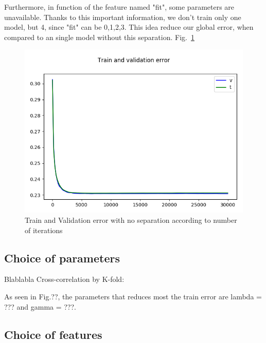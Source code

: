 \documentclass[10pt,conference,compsocconf]{IEEEtran}
\begin{document}
	Furthermore, in function of the feature named "fit", some parameters are unavailable. Thanks to this important information, we don't train only one model, but 4, since "fit" can be {0,1,2,3}.
	This idea reduce our global error, when compared to an single model without this separation. Fig.~\ref{fig:noSepFunction}
	
	\begin{figure}[tbp]
		\centering
		\includegraphics[width=\columnwidth]{valid_train_error_with_thresh_no_jet.png}
		\caption{Train and Validation error with no separation according to number of iterations}
		\vspace{-3mm}
		\label{fig:noSepFunction}
	\end{figure}
	
	\subsection{Choice of parameters}
	Blablabla
	Cross-correlation by K-fold:
	
	As seen in Fig.??, the parameters that reduces most the train error are lambda = ??? and gamma = ???.
	
	\subsection{Choice of features}
	
\end{document}
